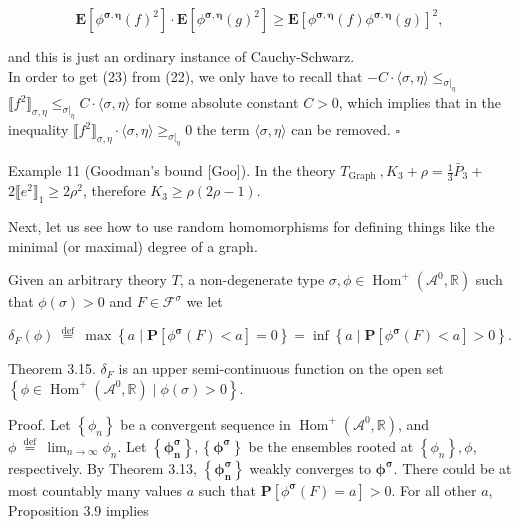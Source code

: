 \documentclass[10pt]{article}
\begin{document}
$$
\mathbf{E}\left[\phi^{\boldsymbol{\sigma}, \boldsymbol{\eta}}(f)^{2}\right] \cdot \mathbf{E}\left[\phi^{\boldsymbol{\sigma}, \boldsymbol{\eta}}(g)^{2}\right] \geq \mathbf{E}\left[\phi^{\boldsymbol{\sigma}, \boldsymbol{\eta}}(f) \phi^{\boldsymbol{\sigma}, \boldsymbol{\eta}}(g)\right]^{2},
$$

and this is just an ordinary instance of Cauchy-Schwarz.\\
In order to get (23) from (22), we only have to recall that $-C \cdot\langle\sigma, \eta\rangle \leq_{\left.\sigma\right|_{\eta}}$ $\llbracket f^{2} \rrbracket_{\sigma, \eta} \leq_{\left.\sigma\right|_{\eta}} C \cdot\langle\sigma, \eta\rangle$ for some absolute constant $C>0$, which implies that in the inequality $\llbracket f^{2} \rrbracket_{\sigma, \eta} \cdot\langle\sigma, \eta\rangle \geq_{\left.\sigma\right|_{\eta}} 0$ the term $\langle\sigma, \eta\rangle$ can be removed. \(\square\)

Example 11 (Goodman's bound [Goo]). In the theory $T_{\text {Graph }}, K_{3}+\rho=\frac{1}{3} \bar{P}_{3}+$ $2 \llbracket e^{2} \rrbracket_{1} \geq 2 \rho^{2}$, therefore $K_{3} \geq \rho(2 \rho-1)$.

Next, let us see how to use random homomorphisms for defining things like the minimal (or maximal) degree of a graph.

Given an arbitrary theory $T$, a non-degenerate type $\sigma, \phi \in \operatorname{Hom}^{+}\left(\mathcal{A}^{0}, \mathbb{R}\right)$ such that $\phi(\sigma)>0$ and $F \in \mathcal{F}^{\sigma}$ we let


\begin{equation*}
\delta_{F}(\phi) \stackrel{\text { def }}{=} \max \left\{a \mid \mathbf{P}\left[\phi^{\boldsymbol{\sigma}}(F)<a\right]=0\right\}=\inf \left\{a \mid \mathbf{P}\left[\phi^{\boldsymbol{\sigma}}(F)<a\right]>0\right\} . \tag{24}
\end{equation*}


Theorem 3.15. $\delta_{F}$ is an upper semi-continuous function on the open set $\left\{\phi \in \operatorname{Hom}^{+}\left(\mathcal{A}^{0}, \mathbb{R}\right) \mid \phi(\sigma)>0\right\}$.

Proof. Let $\left\{\phi_{n}\right\}$ be a convergent sequence in $\operatorname{Hom}^{+}\left(\mathcal{A}^{0}, \mathbb{R}\right)$, and $\phi \stackrel{\text { def }}{=} \lim _{n \rightarrow \infty} \phi_{n}$. Let $\left\{\boldsymbol{\phi}_{\boldsymbol{n}}^{\boldsymbol{\sigma}}\right\},\left\{\boldsymbol{\phi}^{\boldsymbol{\sigma}}\right\}$ be the ensembles rooted at $\left\{\phi_{n}\right\}, \phi$, respectively. By Theorem 3.13, $\left\{\boldsymbol{\phi}_{\boldsymbol{n}}^{\boldsymbol{\sigma}}\right\}$ weakly converges to $\boldsymbol{\phi}^{\boldsymbol{\sigma}}$. There could be at most countably many values $a$ such that $\mathbf{P}\left[\phi^{\boldsymbol{\sigma}}(F)=a\right]>0$. For all other $a$, Proposition 3.9 implies
\end{document}
